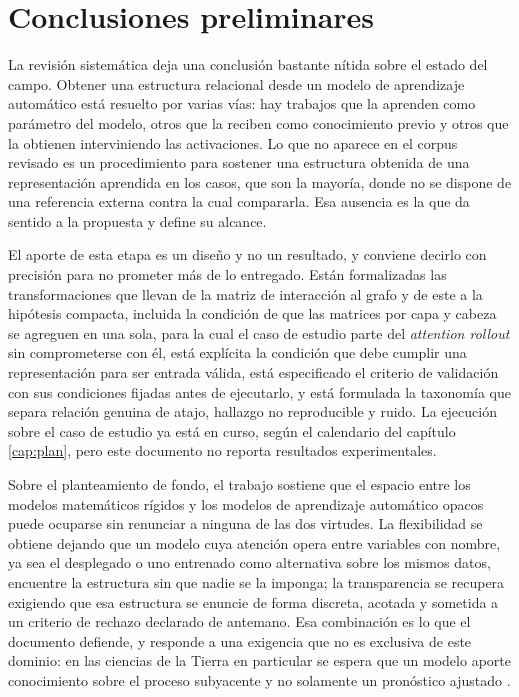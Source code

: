 
\chapter{Conclusiones preliminares}

La revisión sistemática deja una conclusión bastante nítida sobre el estado del campo. Obtener una estructura relacional desde un modelo de aprendizaje automático está resuelto por varias vías: hay trabajos que la aprenden como parámetro del modelo, otros que la reciben como conocimiento previo y otros que la obtienen interviniendo las activaciones. Lo que no aparece en el corpus revisado es un procedimiento para sostener una estructura obtenida de una representación aprendida en los casos, que son la mayoría, donde no se dispone de una referencia externa contra la cual compararla. Esa ausencia es la que da sentido a la propuesta y define su alcance.

El aporte de esta etapa es un diseño y no un resultado, y conviene decirlo con precisión para no prometer más de lo entregado. Están formalizadas las transformaciones que llevan de la matriz de interacción al grafo y de este a la hipótesis compacta, incluida la condición de que las matrices por capa y cabeza se agreguen en una sola, para la cual el caso de estudio parte del \emph{attention rollout} \cite{abnar2020quantifying} sin comprometerse con él, está explícita la condición que debe cumplir una representación para ser entrada válida, está especificado el criterio de validación con sus condiciones fijadas antes de ejecutarlo, y está formulada la taxonomía que separa relación genuina de atajo, hallazgo no reproducible y ruido. La ejecución sobre el caso de estudio ya está en curso, según el calendario del capítulo \ref{cap:plan}, pero este documento no reporta resultados experimentales.

Sobre el planteamiento de fondo, el trabajo sostiene que el espacio entre los modelos matemáticos rígidos y los modelos de aprendizaje automático opacos puede ocuparse sin renunciar a ninguna de las dos virtudes. La flexibilidad se obtiene dejando que un modelo cuya atención opera entre variables con nombre, ya sea el desplegado o uno entrenado como alternativa sobre los mismos datos, encuentre la estructura sin que nadie se la imponga; la transparencia se recupera exigiendo que esa estructura se enuncie de forma discreta, acotada y sometida a un criterio de rechazo declarado de antemano. Esa combinación es lo que el documento defiende, y responde a una exigencia que no es exclusiva de este dominio: en las ciencias de la Tierra en particular se espera que un modelo aporte conocimiento sobre el proceso subyacente y no solamente un pronóstico ajustado \cite{reichstein2019deep}.

